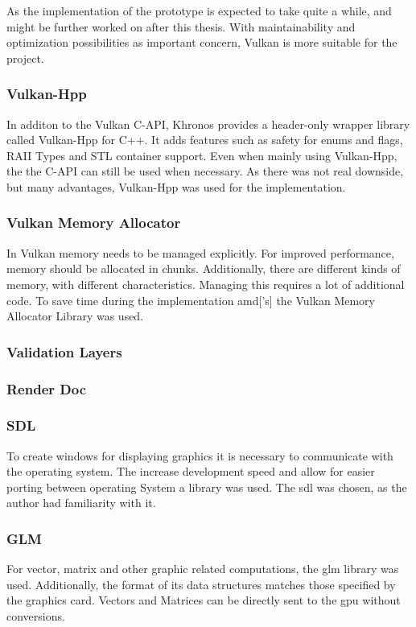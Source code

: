 As the implementation of the prototype is expected to take quite a while, and might be further worked on after this thesis. With maintainability and optimization possibilities as important concern, Vulkan is more suitable for the project. 


\subsubsection{Vulkan-Hpp}
In additon to the Vulkan C-API, Khronos provides a header-only wrapper library called Vulkan-Hpp for C++. It adds features such as safety for enums and flags, RAII Types and STL container support. Even when mainly using Vulkan-Hpp, the the C-API can still be used when necessary. As there was not real downside, but many advantages, Vulkan-Hpp was used for the implementation.

\subsubsection{Vulkan Memory Allocator}
In Vulkan memory needs to be managed explicitly. For improved performance, memory should be allocated in chunks. Additionally, there are different kinds of memory, with different characteristics. Managing this requires a lot of additional code. To save time during the implementation \gls{amd}['s] the Vulkan Memory Allocator Library \cite{amd:vulkanmemoryallocator} was used.

\subsubsection{Validation Layers}

\subsubsection{Render Doc}

\subsubsection{SDL}
To create windows for displaying graphics it is necessary to communicate with the operating system. The increase development speed and allow for easier porting between operating System a library was used. The \gls{sdl} \cite{sdl} was chosen, as the author had familiarity with it.

\subsubsection{GLM}
For vector, matrix and other graphic related computations, the \gls{glm} library \cite{glm} was used. Additionally, the format of its data structures matches those specified by the graphics card. Vectors and Matrices can be directly sent to the \gls{gpu} without conversions.


